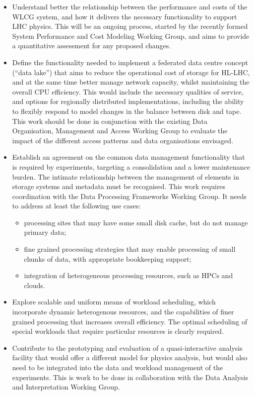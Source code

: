 \documentclass[12pt,a4paper]{article}
\begin{document}
\begin{itemize}
\item
  Understand better the relationship between the performance and costs
  of the WLCG system, and how it delivers the necessary functionality to
  support LHC physics. This will be an ongoing process, started by the
  recently formed System Performance and Cost Modeling Working Group,
  and aims to provide a quantitative assessment for any proposed
  changes.
\item
  Define the functionality needed to implement a federated data centre
  concept (``data lake'') that aims to reduce the operational cost of
  storage for HL-LHC, and at the same time better manage network
  capacity, whilst maintaining the overall CPU efficiency. This would
  include the necessary qualities of service, and options for regionally
  distributed implementations, including the ability to flexibly respond
  to model changes in the balance between disk and tape. This work
  should be done in conjunction with the existing Data Organisation,
  Management and Access Working Group to evaluate the impact of the
  different access patterns and data organisations envisaged.
\item
  Establish an agreement on the common data management functionality
  that is required by experiments, targeting a consolidation and a lower
  maintenance burden. The intimate relationship between the management
  of elements in storage systems and metadata must be recognised. This
  work requires coordination with the Data Processing Frameworks
  Working Group. It
  needs to address at least the following use cases:

  \begin{itemize}
  \item
    processing sites that may have some small disk cache, but do not
    manage primary data;
  \item
    fine grained processing strategies that may enable processing of
    small chunks of data, with appropriate bookkeeping support;
  \item
    integration of heterogeneous processing resources, such as HPCs and
    clou\-ds.
  \end{itemize}
\item
  Explore scalable and uniform means of workload scheduling, which
  incorporate dynamic heterogenous resources, and the capabilities of
  finer grained processing that increases overall efficiency. The
  optimal scheduling of special workloads that require particular
  resources is clearly required.
\item
  Contribute to the prototyping and evaluation of a quasi-interactive
  analysis facility that would offer a different model for physics
  analysis, but would also need to be integrated into the data and
  workload management of the experiments. This is work to be done in
  collaboration with the Data Analysis and Interpretation Working Group.
\end{itemize}
\end{document}
